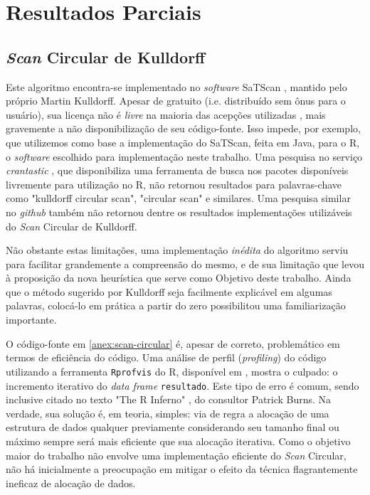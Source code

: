 \documentclass[
	12pt,				%
	openright,			%
	twoside,			%
	a4paper,			%
	english,			%
	brazil,				%
	]{abntex2}
\begin{document}
\chapter{Resultados Parciais}
\label{chap:parciais}
\section{\textit{Scan} Circular de Kulldorff}

Este algoritmo encontra-se implementado no \textit{software} SaTScan \cite{_satscan_????}, mantido pelo próprio Martin Kulldorff. Apesar de gratuito (i.e. distribuído sem ônus para o usuário), sua licença não é \textit{livre} na maioria das acepções utilizadas \cite{_free_????}, mais gravemente a não disponibilização de seu código-fonte. Isso impede, por exemplo, que utilizemos como base a implementação do SaTScan, feita em Java, para o R, o \textit{software} escolhido para implementação neste trabalho. Uma pesquisa no serviço \textit{crantastic} \cite{_its_????}, que disponibiliza uma ferramenta de busca nos pacotes disponíveis livremente para utilização no R, não retornou resultados para palavras-chave como "kulldorff circular scan", "circular scan" e similares. Uma pesquisa similar no \textit{github} também não retornou dentre os resultados implementações utilizáveis do \textit{Scan} Circular de Kulldorff.

Não obstante estas limitações, uma implementação \textit{inédita} do algoritmo serviu para facilitar grandemente a compreensão do mesmo, e de sua limitação que levou à proposição da nova heurística que serve como Objetivo deste trabalho. Ainda que o método sugerido por Kulldorff seja facilmente explicável em algumas palavras, colocá-lo em prática a partir do zero possibilitou uma familiarização importante.

O código-fonte em \ref{anex:scan-circular} é, apesar de correto, problemático em termos de eficiência do código. Uma análise de perfil (\textit{profiling}) do código utilizando a ferramenta \texttt{Rprofvis} do R, disponível em \cite{_rpubs_????}, mostra o culpado: o incremento iterativo do \textit{data frame} \texttt{resultado}. Este tipo de erro é comum, sendo inclusive citado no texto "The R Inferno" \cite{burns2012r}, do consultor Patrick Burns. Na verdade, sua solução é, em teoria, simples: via de regra a alocação de uma estrutura de dados qualquer previamente considerando seu tamanho final ou máximo sempre será mais eficiente que sua alocação iterativa. Como o objetivo maior do trabalho não envolve uma implementação eficiente do \textit{Scan} Circular, não há inicialmente a preocupação em mitigar o efeito da técnica flagrantemente ineficaz de alocação de dados. 
\end{document}
